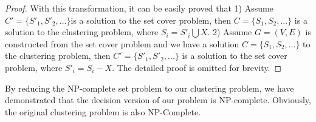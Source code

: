 \begin{proof}
With this transformation, it can be easily proved that 1) Assume \(C'=\{S'_1, S'_2, ...\}\)is a solution to the set cover problem, then \(C=\{S_1, S_2, ...\}\)  is a solution to the clustering problem, where \(S_i = S'_i \bigcup X\). 2) Assume \(G =(V,E)\) is constructed from the set cover problem and we have a solution \(C=\{S_1, S_2, ...\}\) to the clustering problem, then \(C'=\{S'_1, S'_2, ...\}\) is a solution to the set cover problem, where \(S'_i=S_i - X\). The detailed proof is omitted for brevity. 
\end{proof}
By reducing the NP-complete set problem to our clustering problem, we have demonstrated that the decision version of our problem is NP-complete. Obviously, the original clustering problem is also NP-Complete.
